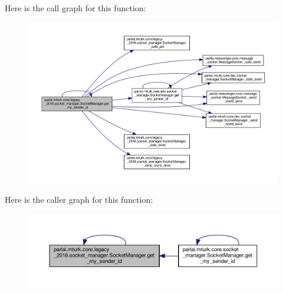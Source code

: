 Here is the call graph for this function\+:
\nopagebreak
\begin{figure}[H]
\begin{center}
\leavevmode
\includegraphics[width=350pt]{classparlai_1_1mturk_1_1core_1_1legacy__2018_1_1socket__manager_1_1SocketManager_a8fd31d452501b480aad260eebaf51c8e_cgraph}
\end{center}
\end{figure}
Here is the caller graph for this function\+:
\nopagebreak
\begin{figure}[H]
\begin{center}
\leavevmode
\includegraphics[width=350pt]{classparlai_1_1mturk_1_1core_1_1legacy__2018_1_1socket__manager_1_1SocketManager_a8fd31d452501b480aad260eebaf51c8e_icgraph}
\end{center}
\end{figure}
\mbox{\label{classparlai_1_1mturk_1_1core_1_1legacy__2018_1_1socket__manager_1_1SocketManager_a260df8c8135ae0759b5578283db9fd89}} 
